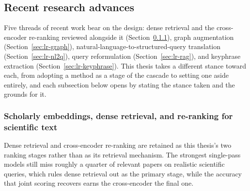 
\subsection{Recent research advances}
\label{sec:recent-advances}

Five threads of recent work bear on the design: dense retrieval and
the cross-encoder re-ranking reviewed alongside it
(Section~\ref{sec:lr-dense}), graph augmentation
(Section~\ref{sec:lr-graph}), natural-language-to-structured-query
translation (Section~\ref{sec:lr-nl2q}), query reformulation
(Section~\ref{sec:lr-rag}), and keyphrase extraction
(Section~\ref{sec:lr-keyphrase}).  This thesis takes a different
stance toward each, from adopting a method as a stage of the cascade
to setting one aside entirely, and each subsection below opens by
stating the stance taken and the grounds for it.

\subsubsection{Scholarly embeddings, dense retrieval, and re-ranking for scientific text}
\label{sec:lr-dense}

Dense retrieval and cross-encoder re-ranking are retained as this
thesis's two ranking stages rather than as its retrieval mechanism.
The strongest single-pass models still miss roughly a quarter of
relevant papers on realistic scientific queries, which rules dense
retrieval out as the primary stage, while the accuracy that joint
scoring recovers earns the cross-encoder the final one.

